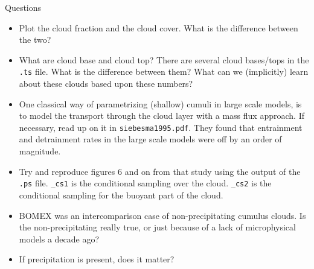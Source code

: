 \documentclass[handout]{beamer}
\newcommand{\code}[1]{{\tt #1}}
\begin{document}
\begin{frame}[allowframebreaks]{Questions}
 \begin{itemize}
  \item Plot the cloud fraction and the cloud cover. What is the difference between the two?
  \item What are cloud base and cloud top? There are several cloud bases/tops in the \code{.ts} file. What is the difference between them? What can we (implicitly) learn about these clouds based upon these numbers?
  \item One classical way of parametrizing (shallow) cumuli in large scale models, is to model the transport through the cloud layer with a mass flux approach. If necessary, read up on it in \code{siebesma1995.pdf}. They found that entrainment and detrainment rates in the large scale models were off by an order of magnitude.
  \item Try and reproduce figures 6 and on from that study using the output of the \code{.ps} file. \code{\_cs1} is the conditional sampling over the cloud. \code{\_cs2} is the conditional sampling for the buoyant part of the cloud.
  \item BOMEX was an intercomparison case of non-precipitating cumulus clouds. Is the non-precipitating really true, or just because of a lack of microphysical models a decade ago?
  \item  If precipitation is present, does it matter?
 \end{itemize}
\end{frame}
\end{document}

